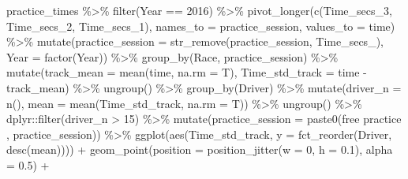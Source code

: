 \documentclass[
]{book}
\newenvironment{Shaded}{\begin{snugshade}}{\end{snugshade}}
\newcommand{\AttributeTok}[1]{\textcolor[rgb]{0.77,0.63,0.00}{#1}}
\newcommand{\DecValTok}[1]{\textcolor[rgb]{0.00,0.00,0.81}{#1}}
\newcommand{\FloatTok}[1]{\textcolor[rgb]{0.00,0.00,0.81}{#1}}
\newcommand{\FunctionTok}[1]{\textcolor[rgb]{0.00,0.00,0.00}{#1}}
\newcommand{\NormalTok}[1]{#1}
\newcommand{\SpecialCharTok}[1]{\textcolor[rgb]{0.00,0.00,0.00}{#1}}
\newcommand{\StringTok}[1]{\textcolor[rgb]{0.31,0.60,0.02}{#1}}
\begin{document}
\begin{Shaded}
\begin{Highlighting}[]
\NormalTok{practice\_times }\SpecialCharTok{\%\textgreater{}\%}
  \FunctionTok{filter}\NormalTok{(Year }\SpecialCharTok{==} \DecValTok{2016}\NormalTok{) }\SpecialCharTok{\%\textgreater{}\%} 
  \FunctionTok{pivot\_longer}\NormalTok{(}\FunctionTok{c}\NormalTok{(Time\_secs\_3, Time\_secs\_2, Time\_secs\_1), }\AttributeTok{names\_to =} \StringTok{\textquotesingle{}practice\_session\textquotesingle{}}\NormalTok{, }\AttributeTok{values\_to =} \StringTok{\textquotesingle{}time\textquotesingle{}}\NormalTok{) }\SpecialCharTok{\%\textgreater{}\%}
  \FunctionTok{mutate}\NormalTok{(}\AttributeTok{practice\_session =} \FunctionTok{str\_remove}\NormalTok{(practice\_session, }\StringTok{\textquotesingle{}Time\_secs\_\textquotesingle{}}\NormalTok{),}
         \AttributeTok{Year =} \FunctionTok{factor}\NormalTok{(Year)) }\SpecialCharTok{\%\textgreater{}\%}
   \FunctionTok{group\_by}\NormalTok{(Race, practice\_session) }\SpecialCharTok{\%\textgreater{}\%}
   \FunctionTok{mutate}\NormalTok{(}\AttributeTok{track\_mean =} \FunctionTok{mean}\NormalTok{(time, }\AttributeTok{na.rm =}\NormalTok{ T),}
          \AttributeTok{Time\_std\_track =}\NormalTok{ time }\SpecialCharTok{{-}}\NormalTok{ track\_mean) }\SpecialCharTok{\%\textgreater{}\%} 
   \FunctionTok{ungroup}\NormalTok{() }\SpecialCharTok{\%\textgreater{}\%} 
   \FunctionTok{group\_by}\NormalTok{(Driver) }\SpecialCharTok{\%\textgreater{}\%} 
   \FunctionTok{mutate}\NormalTok{(}\AttributeTok{driver\_n =} \FunctionTok{n}\NormalTok{(),}
          \AttributeTok{mean =} \FunctionTok{mean}\NormalTok{(Time\_std\_track, }\AttributeTok{na.rm =}\NormalTok{ T)) }\SpecialCharTok{\%\textgreater{}\%}
   \FunctionTok{ungroup}\NormalTok{() }\SpecialCharTok{\%\textgreater{}\%}
\NormalTok{   dplyr}\SpecialCharTok{::}\FunctionTok{filter}\NormalTok{(driver\_n }\SpecialCharTok{\textgreater{}} \DecValTok{15}\NormalTok{) }\SpecialCharTok{\%\textgreater{}\%} 
  \FunctionTok{mutate}\NormalTok{(}\AttributeTok{practice\_session =} \FunctionTok{paste0}\NormalTok{(}\StringTok{\textquotesingle{}free practice \textquotesingle{}}\NormalTok{, practice\_session)) }\SpecialCharTok{\%\textgreater{}\%}  
   \FunctionTok{ggplot}\NormalTok{(}\FunctionTok{aes}\NormalTok{(Time\_std\_track, }\AttributeTok{y =} \FunctionTok{fct\_reorder}\NormalTok{(Driver, }\FunctionTok{desc}\NormalTok{(mean)))) }\SpecialCharTok{+}
   \FunctionTok{geom\_point}\NormalTok{(}\AttributeTok{position =} \FunctionTok{position\_jitter}\NormalTok{(}\AttributeTok{w =} \DecValTok{0}\NormalTok{, }\AttributeTok{h =} \FloatTok{0.1}\NormalTok{), }\AttributeTok{alpha =} \FloatTok{0.5}\NormalTok{) }\SpecialCharTok{+}

\end{Highlighting}
\end{Shaded}
\end{document}
